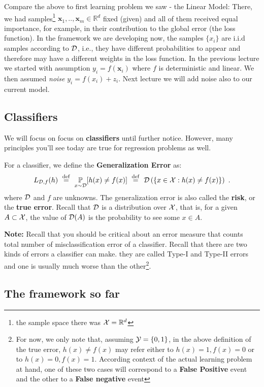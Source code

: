{Compare the above to first learning problem we saw - the Linear Model: There, we had samples\footnote{the sample space there was $\mathcal{X}=\mathbb{R}^d$} $\mathbf{x}_1,..,\mathbf{x}_m\in\mathbb{R}^d$  fixed (given) and all of them received equal importance, for example, in their contribution to the global error (the loss function). In the framework we are developing now, the samples $\{x_i\}$ are  i.i.d samples according to $\mathcal{D}$, i.e., they have different probabilities to appear and therefore may have a different weights in the loss function.
In the previous lecture we started with assumption $y_i=f(\mathbf{x}_i)$ where $f$ is deterministic and linear. We then assumed \textit{noise} $y_i = f(x_i)+z_i$. Next lecture we will add noise also to our current model.

\subsection{Classifiers}

We will focus on focus on \textbf{classifiers} until further notice. However, many principles you'll see today are true for regression problems as well.

For a classifier, we define the \textbf{Generalization Error} as:
\[
L_{\mathcal{D},f}(h) ~\stackrel{\mathrm{def}}{=}~ \operatorname*{\mathbb{P}}_{x \sim \mathcal{D}}[h(x) \neq f(x)] ~\stackrel{\mathrm{def}}{=}~ \mathcal{D}\left( \{ x \in \mathcal{X} : h(x)
  \neq f(x) \}\right) ~.
\]
where $\mathcal{D}$ and $f$ are unknowns. The generalization error is also called the \textbf{risk}, or the \textbf{true error}. Recall that $\mathcal{D}$ is a distribution over $\mathcal{X}$, that is, for a given $A \subset \mathcal{X}$, the value of $\mathcal{D}(A)$ is the probability to see some $x \in A$.

{\bf Note:} Recall that you should be critical about an error measure that counts
total number of misclassification error of a classifier. Recall that  there are two kinds of errors a classifier can make. they are called Type-I and Type-II errors and one is usually much worse than the other\footnote{For now, we only note that, assuming $\mathcal{Y} =\{0,1\}$, in the above definition of the true error, $h(x) \neq f(x)$ may refer either to  $h(x)=1, f(x)=0$ or to $h(x)=0, f(x)=1$. According context of the actual learning problem at hand, one of these two cases  will correspond to a \textbf{False Positive} event and the other to a \textbf{False negative} event}.

\subsection{The framework so far} \label{sec:frame}

}
